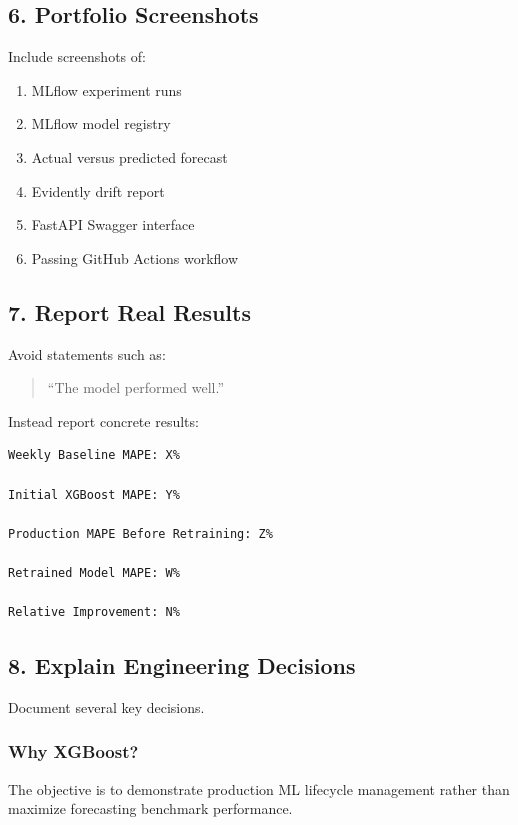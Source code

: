 \documentclass[11pt,a4paper]{article}
\begin{document}
\subsection{6. Portfolio Screenshots}

Include screenshots of:

\begin{enumerate}
    \item MLflow experiment runs
    \item MLflow model registry
    \item Actual versus predicted forecast
    \item Evidently drift report
    \item FastAPI Swagger interface
    \item Passing GitHub Actions workflow
\end{enumerate}

\subsection{7. Report Real Results}

Avoid statements such as:

\begin{quote}
``The model performed well.''
\end{quote}

Instead report concrete results:

\begin{lstlisting}
Weekly Baseline MAPE: X%

Initial XGBoost MAPE: Y%

Production MAPE Before Retraining: Z%

Retrained Model MAPE: W%

Relative Improvement: N%
\end{lstlisting}

\subsection{8. Explain Engineering Decisions}

Document several key decisions.

\subsubsection{Why XGBoost?}

The objective is to demonstrate production ML lifecycle management rather than maximize forecasting benchmark performance.
\end{document}
